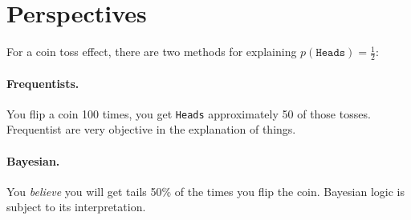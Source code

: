 \section{Perspectives}

For a coin toss effect, there are two methods for explaining $p(\texttt{Heads})=\frac{1}{2}$:

\paragraph{Frequentists.} 
You flip a coin 100 times, you get \texttt{Heads} approximately 50 of those tosses. 
Frequentist are very objective in the explanation of things. 

\paragraph{Bayesian.}
You \textit{believe} you will get tails 50\% of the times you flip the coin. 
Bayesian logic is subject to its interpretation. 

